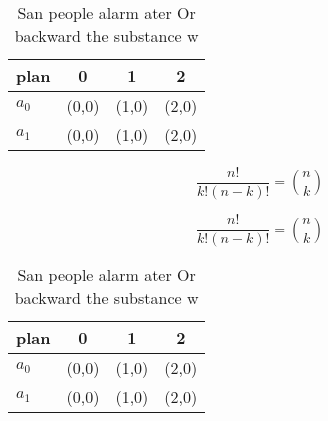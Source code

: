 \documentclass[a4paper]{article}
\begin{document}
\begin{table}
\begin{adjustbox}{width=0.6\columnwidth}
\begin{tabular}{|l|l|l|l|}
\hline
\textbf{plan} & \multicolumn{1}{c|}{\textbf{0}} & \multicolumn{1}{c|}{\textbf{1}} & \multicolumn{1}{c|}{\textbf{2}} \\ \hline
\textbf{$a_0$}  & (0,0) & (1,0) & (2,0) \\ \hline
\textbf{$a_1$}  & (0,0) & (1,0) & (2,0) \\ \hline
\end{tabular}
\end{adjustbox}
\caption{San people alarm ater Or backward the substance w
}
\end{table}

\[ \frac{n!}{k!(n-k)!} = \binom{n}{k} \]

\[ \frac{n!}{k!(n-k)!} = \binom{n}{k} \]

\begin{table}
\begin{adjustbox}{width=0.6\columnwidth}
\begin{tabular}{|l|l|l|l|}
\hline
\textbf{plan} & \multicolumn{1}{c|}{\textbf{0}} & \multicolumn{1}{c|}{\textbf{1}} & \multicolumn{1}{c|}{\textbf{2}} \\ \hline
\textbf{$a_0$}  & (0,0) & (1,0) & (2,0) \\ \hline
\textbf{$a_1$}  & (0,0) & (1,0) & (2,0) \\ \hline
\end{tabular}
\end{adjustbox}
\caption{San people alarm ater Or backward the substance w
}
\end{table}
\end{document}
